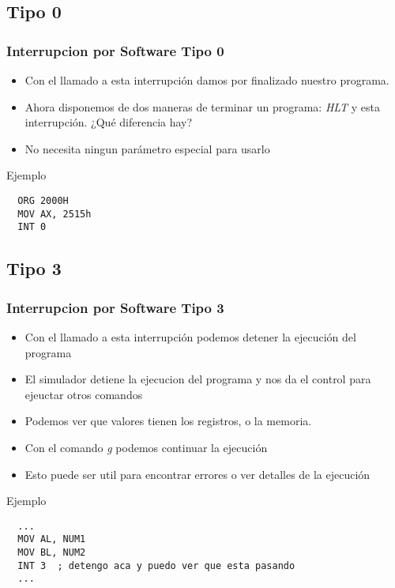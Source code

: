 \documentclass{beamer}
\begin{document}
\subsection{Tipo 0}
\begin{frame}[fragile]
\frametitle{Interrupcion por Software Tipo 0}
\begin{itemize}
 \item Con el llamado a esta interrupción damos por finalizado nuestro programa.
 \item Ahora disponemos de dos maneras de terminar un programa: \emph{HLT} y esta interrupción. ¿Qué diferencia hay?
 \item No necesita ningun parámetro especial para usarlo
\end{itemize}

\begin{block}{Ejemplo}

\begin{verbatim}
  ORG 2000H
  MOV AX, 2515h
  INT 0
\end{verbatim}

\end{block}

\end{frame}


\subsection{Tipo 3}
\begin{frame}[fragile]
\frametitle{Interrupcion por Software Tipo 3}
\begin{itemize}
 \item Con el llamado a esta interrupción podemos detener la ejecución del programa
 \item El simulador detiene la ejecucion del programa y nos da el control para ejeuctar otros comandos
 \item Podemos ver que valores tienen los registros, o la memoria.
 \item Con el comando \emph{g} podemos continuar la ejecución
 \item Esto puede ser util para encontrar errores o ver detalles de la ejecución
\end{itemize}

\begin{block}{Ejemplo}

\begin{verbatim}
  ... 
  MOV AL, NUM1 
  MOV BL, NUM2
  INT 3  ; detengo aca y puedo ver que esta pasando
  ...
\end{verbatim}

\end{block}

\end{frame}
\end{document}
